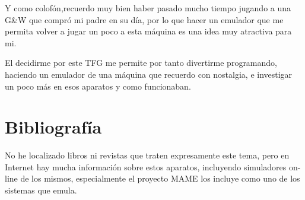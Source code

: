 \documentclass[../main.tex]{subfiles}
\begin{document}
Y como colofón,recuerdo muy bien haber pasado mucho tiempo jugando a una G\&W que compró mi padre en su día, por lo que hacer un emulador que me permita volver a jugar un poco a esta máquina es una idea muy atractiva para mi.

El decidirme por este TFG me permite por tanto divertirme programando, haciendo un emulador de una máquina que recuerdo con nostalgia, e investigar un poco más en esos aparatos y como funcionaban.

\section{Bibliografía}

No he localizado libros ni revistas que traten expresamente este tema, pero en Internet hay mucha información sobre estos aparatos, incluyendo simuladores on-line de los mismos, especialmente el proyecto MAME los incluye como uno de los sistemas que emula.
\end{document}
